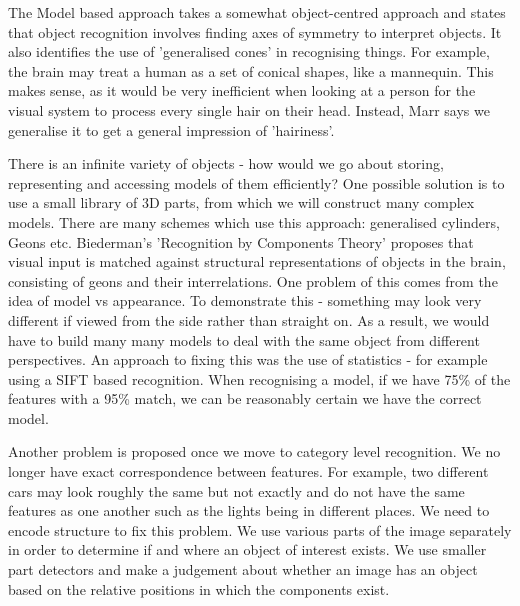 \documentclass{article}
\begin{document}
	\par 
	The Model based approach takes a somewhat object-centred approach and states that object recognition involves finding axes of symmetry to interpret objects. It also identifies the use of 'generalised cones' in recognising things. For example, the brain may treat a human as a set of conical shapes, like a mannequin. This makes sense, as it would be very inefficient when looking at a person for the visual system to process every single hair on their head. Instead, Marr says we generalise it to get a general impression of 'hairiness'.
	
	\par 
	There is an infinite variety of objects - how would we go about storing, representing and accessing models of them efficiently? One possible solution is to use a small library of 3D parts, from which we will construct many complex models. There are many schemes which use this approach: generalised cylinders, Geons etc. Biederman's 'Recognition by Components Theory' proposes that visual input is matched against structural representations of objects in the brain, consisting of geons and their interrelations. One problem of this comes from the idea of model vs appearance. To demonstrate this - something may look very different if viewed from the side rather than straight on. As a result, we would have to build many many models to deal with the same object from different perspectives. An approach to fixing this was the use of statistics - for example using a SIFT based recognition. When recognising a model, if we have 75\% of the features with a 95\% match, we can be reasonably certain we have the correct model.
	
	\par 
	Another problem is proposed once we move to category level recognition. We no longer have exact correspondence between features. For example, two different cars may look roughly the same but not exactly and do not have the same features as one another such as the lights being in different places. We need to encode structure to fix this problem. We use various parts of the image separately in order to determine if and where an object of interest exists. We use smaller part detectors and make a judgement about whether an image has an object based on the relative positions in which the components exist.
	\newpage
	\listoffigures
	\printindex
\end{document}
